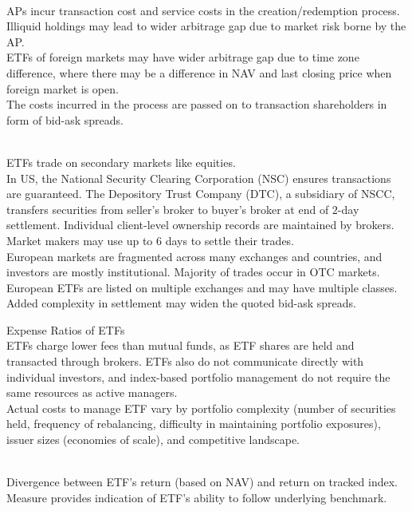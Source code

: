 \begin{definition} \\
APs incur transaction cost and service costs in the creation/redemption process.\\
Illiquid holdings may lead to wider arbitrage gap due to market risk borne by the AP.\\
ETFs of foreign markets may have wider arbitrage gap due to time zone difference, where there may be a difference in NAV and last closing price when foreign market is open.\\
The costs incurred in the process are passed on to transaction shareholders in form of bid-ask spreads.
\end{definition}

\begin{remark} \\
ETFs trade on secondary markets like equities.\\
In US, the National Security Clearing Corporation (NSC) ensures transactions are guaranteed. The Depository Trust Company (DTC), a subsidiary of NSCC, transfers securities from seller's broker to buyer's broker at end of $2$-day settlement. Individual client-level ownership records are maintained by brokers. Market makers may use up to $6$ days to settle their trades.\\
European markets are fragmented across many exchanges and countries, and investors are mostly institutional. Majority of trades occur in OTC markets. European ETFs are listed on multiple exchanges and may have multiple classes. Added complexity in settlement may widen the quoted bid-ask spreads.
\end{remark}

\begin{remark} Expense Ratios of ETFs\\
ETFs charge lower fees than mutual funds, as ETF shares are held and transacted through brokers. ETFs also do not communicate directly with individual investors, and index-based portfolio management do not require the same resources as active managers. \\
Actual costs to manage ETF vary by portfolio complexity (number of securities held, frequency of rebalancing, difficulty in maintaining portfolio exposures), issuer sizes (economies of scale), and competitive landscape.
\end{remark}

\begin{definition} \\
Divergence between ETF's return (based on NAV) and return on tracked index.\\
Measure provides indication of ETF's ability to follow underlying benchmark.
\end{definition}

